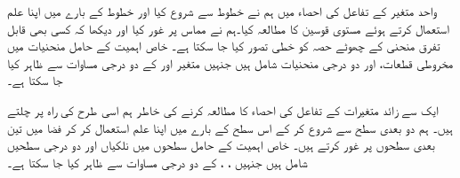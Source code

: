 واحد متغیر کے تفاعل کی احصاء میں  ہم  نے خطوط سے شروع کیا اور خطوط کے بارے میں اپنا علم  استعمال کرتے ہوئے مستوی قوسین کا مطالعہ کیا۔ہم نے مماس پر غور کیا اور دیکھا کہ  کسی بھی قابل تفرق  منحنی    کے چھوٹے حصہ کو خطی تصور کیا جا سکتا ہے۔ خاص  اہمیت کے حامل منحنیات میں مخروطی قطعات، اور دو درجی منحنیات شامل ہیں جنہیں  متغیر  اور  کے دو درجی مساوات سے ظاہر کیا جا سکتا ہے۔

ایک سے زائد متغیرات   کے تفاعل کی احصاء  کا مطالعہ کرنے کی خاطر ہم اسی طرح کی راہ پر چلتے ہیں۔ ہم  دو بعدی سطح سے شروع کر کے اس سطح کے بارے میں اپنا علم استعمال کر کر  فضا میں تین بعدی سطحوں پر غور کرتے ہیں۔ خاص اہمیت کے حامل سطحوں میں نلکیاں اور دو درجی سطحیں شامل ہیں جنہیں ، ،  کے دو درجی مساوات سے ظاہر کیا جا سکتا ہے۔


